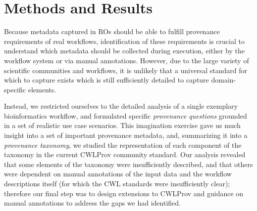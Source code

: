 \section{Methods and Results} 
\label{sec:taxonomy}
Because metadata captured in ROs should be able to fulfill provenance requirements of real workflows, identification of these requirements is crucial to understand which metadata should be collected during execution, either by the workflow system or via manual annotations. However, due to the large variety of scientific communities and workflows, it is unlikely that a universal standard for which to capture exists which is still sufficiently detailed to capture domain-specific elements. 

Instead, we restricted ourselves to the detailed analysis of a single exemplary bioinformatics workflow, and formulated specific \emph{provenance questions} grounded in a set of realistic use case scenarios.
This imagination exercise gave us much insight into a set of important provenance metadata, and, summarizing it into a \emph{provenance taxonomy}, we studied the representation of each component of the taxonomy in the current CWLProv community standard. 
Our analysis revealed that some elements of the taxonomy were insufficiently described, and that others were dependent on manual annotations of the input data and the workflow descriptions itself (for which the CWL standards were insufficiently clear); therefore our final step was to design extensions to CWLProv and guidance on manual annotations to address the gaps we had identified. 


